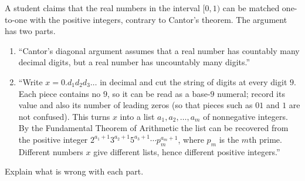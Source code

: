 A student claims that the real numbers in the interval $[0,1)$ can be matched one-to-one with the positive integers, contrary to Cantor's theorem. The argument has two parts.
\begin{enumerate}
\item[(i)] ``Cantor's diagonal argument assumes that a real number has countably many decimal digits, but a real number has uncountably many digits.''
\item[(ii)] ``Write $x=0.d_1d_2d_3\dots$ in decimal and cut the string of digits at every digit $9$. Each piece contains no $9$, so it can be read as a base-$9$ numeral; record its value and also its number of leading zeros (so that pieces such as $01$ and $1$ are not confused). This turns $x$ into a list $a_1,a_2,\dots,a_m$ of nonnegative integers. By the Fundamental Theorem of Arithmetic the list can be recovered from the positive integer $2^{a_1+1}3^{a_2+1}5^{a_3+1}\cdots p_m^{a_m+1}$, where $p_m$ is the $m$th prime. Different numbers $x$ give different lists, hence different positive integers.''
\end{enumerate}
Explain what is wrong with each part.
